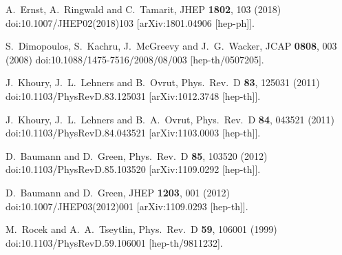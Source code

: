 \documentclass[a4paper,11pt]{article}
\begin{document}
\begin{thebibliography}{99}
  A.~Ernst, A.~Ringwald and C.~Tamarit,
  JHEP {\bf 1802}, 103 (2018)
  doi:10.1007/JHEP02(2018)103
  [arXiv:1801.04906 [hep-ph]].

  S.~Dimopoulos, S.~Kachru, J.~McGreevy and J.~G.~Wacker,
  JCAP {\bf 0808}, 003 (2008)
  doi:10.1088/1475-7516/2008/08/003
  [hep-th/0507205].


  J.~Khoury, J.~L.~Lehners and B.~Ovrut,
  Phys.\ Rev.\ D {\bf 83}, 125031 (2011)
  doi:10.1103/PhysRevD.83.125031
  [arXiv:1012.3748 [hep-th]].


  J.~Khoury, J.~L.~Lehners and B.~A.~Ovrut,
  Phys.\ Rev.\ D {\bf 84}, 043521 (2011)
  doi:10.1103/PhysRevD.84.043521
  [arXiv:1103.0003 [hep-th]].


  D.~Baumann and D.~Green,
  Phys.\ Rev.\ D {\bf 85}, 103520 (2012)
  doi:10.1103/PhysRevD.85.103520
  [arXiv:1109.0292 [hep-th]].


  D.~Baumann and D.~Green,
  JHEP {\bf 1203}, 001 (2012)
  doi:10.1007/JHEP03(2012)001
  [arXiv:1109.0293 [hep-th]].


  M.~Rocek and A.~A.~Tseytlin,
  Phys.\ Rev.\ D {\bf 59}, 106001 (1999)
  doi:10.1103/PhysRevD.59.106001
  [hep-th/9811232].



\end{thebibliography}
\end{document}
